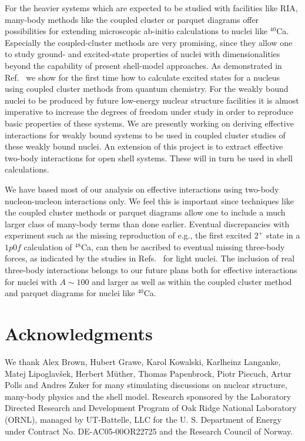 \documentclass[twoside,12pt]{article}
\begin{document}
For the heavier systems which are expected to be 
studied with facilities like RIA, many-body methods like the 
coupled cluster or parquet diagrams offer possibilities for extending
microscopic ab-initio calculations to nuclei like $^{40}$Ca.
Especially the coupled-cluster methods are
very promising, since they allow one to study 
ground- and excited-state properties of nuclei
with dimensionalities beyond the capability of present shell-model
approaches. As demonstrated in Ref.~\cite{kowalski03n} we 
show for the first time how to calculate 
excited states for a nucleus using coupled cluster 
methods from quantum chemistry.
For the weakly bound nuclei to be produced by future low-energy 
nuclear structure facilities
it is almost imperative to increase the
degrees of freedom under study in order to reproduce
basic properties of these systems. 
We are presently working on deriving effective interactions 
for weakly bound systems to be used in coupled cluster 
studies of these weakly bound nuclei. An extension of this project is to extract effective 
two-body interactions for open shell systems. These will in turn  
be used in shell calculations. 

We have based most of our analysis on effective interactions
using two-body nucleon-nucleon interactions only. 
We feel this is important since
techniques like the coupled cluster methods or 
parquet diagrams allow one to include a much larger
class of many-body terms than done earlier. Eventual discrepancies 
with experiment 
such as the missing reproduction of e.g., the first 
excited $2^+$ state in a $1p0f$ calculation
of $^{48}$Ca, can then be ascribed to eventual 
missing three-body forces, as indicated by the studies
in Refs.~\cite{bob1,bob2,bob3,apr98,petr_erich2002,petr_erich2003} 
for light nuclei. 
The inclusion of real three-body interactions belongs 
to our future plans both for effective 
interactions for nuclei with $A\sim 100$ and larger 
as well as within the coupled cluster method and
parquet diagrams for nuclei like $^{40}$Ca.

\section*{Acknowledgments}

We thank Alex Brown, Hubert Grawe, Karol Kowalski, Karlheinz Langanke, Matej Lipoglav\v{s}ek, 
Herbert M\"uther, Thomas Papenbrock, Piotr Piecuch, Artur Polls and Andres Zuker 
for many stimulating discussions on nuclear structure, 
many-body physics and the shell model.
Research sponsored by the Laboratory Directed Research and Development
Program of Oak Ridge National Laboratory (ORNL), managed by
UT-Battelle, LLC for the U. S.  Department of Energy under
Contract No. DE-AC05-00OR22725 and the Research Council of Norway. 
\end{document}
